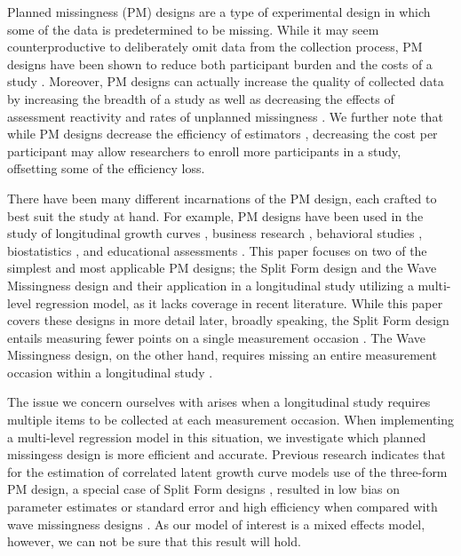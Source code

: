 \documentclass{svjour3}\usepackage[]{graphicx}\usepackage[]{color}
\begin{document}
Planned missingness (PM) designs are a type of experimental design in which some of the data is predetermined to be missing. While it may seem counterproductive to deliberately omit data from the collection process, PM designs have been shown to reduce both participant burden \citep{graham2006planned, saris20048} and the costs of a study \citep{graham2001planned}. Moreover, PM designs can actually increase the quality of collected data by increasing the breadth of a study \citep{little2013planned} as well as decreasing the effects of assessment reactivity and rates of unplanned missingness \citep{harel2015designed}. We further note that while PM designs decrease the efficiency of estimators \citep{rhemtulla2016asymptotic}, decreasing the cost per participant may allow researchers to enroll more participants in a study, offsetting some of the efficiency loss. \par

There have been many different incarnations of the PM design, each crafted to best suit the study at hand. For example, PM designs have been used in the study of longitudinal growth curves \citep{graham2001planned, mcardle1997expanding}, business research \citep{shoemaker1973principles}, behavioral studies \citep{harel2015designed}, biostatistics \citep{andres2006partial, wacholder1994partial}, and educational assessments \citep{zeger1997efficient, sirotnik1977incidence}. This paper focuses on two of the simplest and most applicable PM designs; the Split Form design \citep{raghunathan1995split} and the Wave Missingness design \citep{little2013planned} and their application in a longitudinal study utilizing a multi-level regression model, as it lacks coverage in recent literature. While this paper covers these designs in more detail later, broadly speaking, the Split Form design entails measuring fewer points on a single measurement occasion \citep{raghunathan1995split}. The Wave Missingness design, on the other hand, requires missing an entire measurement occasion within a longitudinal study \citep{graham2001planned}. 

The issue we concern ourselves with arises when a longitudinal study requires multiple items to be collected at each measurement occasion. When implementing a multi-level regression model in this situation, we investigate which planned missingess design is more efficient and accurate. Previous research indicates that for the estimation of correlated latent growth curve models use of the three-form PM design, a special case of Split Form designs \citep{raghunathan1995split}, resulted in low bias on parameter estimates or standard error and high efficiency when compared with wave missingness designs \citep{rhemtulla2014planned}. As our model of interest is a mixed effects model, however, we can not be sure that this result will hold. \par 
\end{document}
